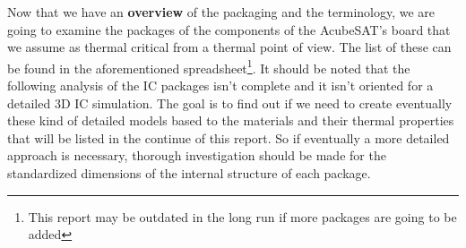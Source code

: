 \documentclass[final]{cubedoc}
\begin{document}
	
	
	
	
	
	Now that we have an \textbf{overview} of the packaging and the terminology, we are going to examine the packages of the components of the AcubeSAT's board that we assume as thermal critical from a thermal point of view. The list of these can be found in the aforementioned spreadsheet\footnote{This report may be outdated in the long run if more packages are going to be added}. It should be noted that the following analysis of the IC packages isn't complete and it isn't oriented for a detailed 3D IC simulation. The goal is to find out if we need to create eventually these kind of detailed models based to the materials and their thermal properties that will be listed in the continue of this report. So if eventually a more detailed approach  is necessary, thorough investigation should be made for the standardized dimensions of the internal structure of each package. 
	
\end{document}
